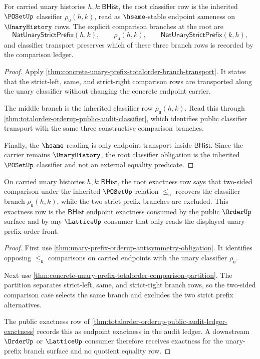 \begin{theorem}
\label{thm:totalorder-root-classifier-obligation}
For carried unary histories $h,k:\mathsf{BHist}$, the root classifier row is
the inherited $\POSetUp$ classifier $\rho_{\mathsf{u}}(h,k)$, read as
$\hsame$-stable endpoint sameness on $\UnaryHistory$ rows. The explicit
comparison branches at the root are
$$
\mathsf{NatUnaryStrictPrefix}(h,k),
\qquad
\rho_{\mathsf{u}}(h,k),
\qquad
\mathsf{NatUnaryStrictPrefix}(k,h),
$$
and classifier transport preserves which of these three branch rows is
recorded by the comparison ledger.
\end{theorem}
\begin{proof}
Apply
\autoref{thm:concrete-unary-prefix-totalorder-branch-transport}. It states
that the strict-left, same, and strict-right comparison rows are transported
along the unary classifier without changing the concrete endpoint carrier.

The middle branch is the inherited classifier row
$\rho_{\mathsf{u}}(h,k)$. Read this through
\autoref{thm:totalorder-orderup-public-audit-classifier}, which identifies
public classifier transport with the same three constructive comparison
branches.

Finally, the $\hsame$ reading is only endpoint transport inside
$\mathsf{BHist}$. Since the carrier remains $\UnaryHistory$, the root
classifier obligation is the inherited $\POSetUp$ classifier and not an
external equality predicate.
\end{proof}

\begin{theorem}
\label{thm:totalorder-root-exactness-obligation}
On carried unary histories $h,k:\mathsf{BHist}$, the root exactness row says
that two-sided comparison under the inherited $\POSetUp$ relation
$\le_{\mathsf{u}}$ recovers the classifier branch
$\rho_{\mathsf{u}}(h,k)$, while the two strict prefix branches are excluded.
This exactness row is the $\mathsf{BHist}$ endpoint exactness consumed by the
public $\OrderUp$ surface and by any $\LatticeUp$ consumer that only reads the
displayed unary-prefix order front.
\end{theorem}
\begin{proof}
First use
\autoref{thm:unary-prefix-orderup-antisymmetry-obligation}. It identifies
opposing $\le_{\mathsf{u}}$ comparisons on carried endpoints with the unary
classifier $\rho_{\mathsf{u}}$.

Next use
\autoref{thm:concrete-unary-prefix-totalorder-comparison-partition}. The
partition separates strict-left, same, and strict-right branch rows, so the
two-sided comparison case selects the same branch and excludes the two strict
prefix alternatives.

The public exactness row of
\autoref{thm:totalorder-orderup-public-audit-ledger-exactness} records this as
endpoint exactness in the audit ledger. A downstream $\OrderUp$ or
$\LatticeUp$ consumer therefore receives exactness for the unary-prefix branch
surface and no quotient equality row.
\end{proof}

